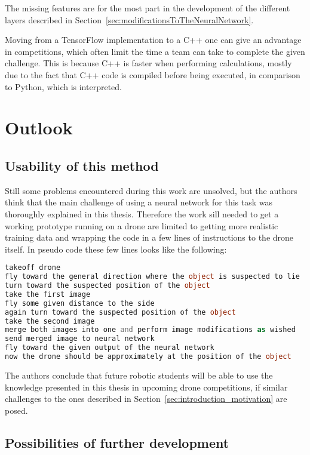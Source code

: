 The missing features are for the most part in the development of the different layers described in Section~\ref{sec:modificationsToTheNeuralNetwork}.

Moving from a TensorFlow implementation to a C++ one can give an advantage in competitions, which often limit the time a team can take to complete the given challenge. This is because C++ is faster when performing calculations, mostly due to the fact that C++ code is compiled before being executed, in comparison to Python, which is interpreted.

\section{Outlook}

\subsection{Usability of this method}

Still some problems encountered during this work are unsolved, but the authors think that the main challenge of using a neural network for this task was thoroughly explained in this thesis. Therefore the work sill needed to get a working prototype running on a drone are limited to getting more realistic training data and wrapping the code in a few lines of instructions to the drone itself. In pseudo code these few lines looks like the following:

\newpage

\begin{lstlisting}[language=PHP]	%actually pseudo code, but php shows no syntax highlighting
takeoff drone
fly toward the general direction where the object is suspected to lie
turn toward the suspected position of the object
take the first image
fly some given distance to the side
again turn toward the suspected position of the object
take the second image
merge both images into one and perform image modifications as wished
send merged image to neural network
fly toward the given output of the neural network
now the drone should be approximately at the position of the object
\end{lstlisting}

The authors conclude that future robotic students will be able to use the knowledge presented in this thesis in upcoming drone competitions, if similar challenges to the ones described in Section~\ref{sec:introduction_motivation} are posed.

\subsection{Possibilities of further development}


